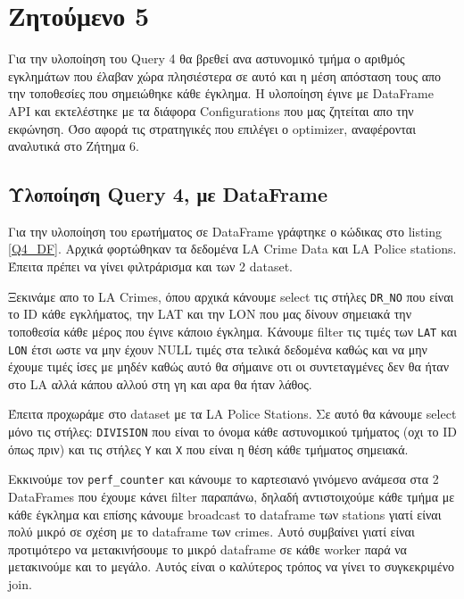 \documentclass[12pt, a4paper]{article}
\begin{document}
\section*{Ζητούμενο 5}

Για την υλοποίηση του Query 4 θα βρεθεί ανα αστυνομικό τμήμα ο αριθμός εγκλημάτων που έλαβαν χώρα
πλησιέστερα σε αυτό και η μέση απόσταση τους απο την τοποθεσίες που σημειώθηκε κάθε έγκλημα. Η υλοποίηση 
έγινε με DataFrame API και εκτελέστηκε με τα διάφορα Configurations που μας ζητείται απο την
εκφώνηση. Όσο αφορά τις στρατηγικές που επιλέγει ο optimizer, αναφέρονται αναλυτικά στο Ζήτημα 6.


\subsection*{Υλοποίηση Query 4, με DataFrame}


Για την υλοποίηση του ερωτήματος σε DataFrame γράφτηκε ο κώδικας στο listing \ref{Q4_DF}.
Αρχικά φορτώθηκαν τα δεδομένα LA Crime Data και LA Police stations. Έπειτα πρέπει να γίνει 
φιλτράρισμα και των 2 dataset. 

Ξεκινάμε απο το LA Crimes, όπου αρχικά κάνουμε select τις στήλες
\texttt{DR\_NO} που είναι το ID κάθε εγκλήματος, την LAT και την LON που μας δίνουν
σημειακά την τοποθεσία κάθε μέρος που έγινε κάποιο έγκλημα. Κάνουμε filter τις τιμές των
\texttt{LAT} και \texttt{LON} έτσι ωστε να μην έχουν NULL τιμές στα τελικά δεδομένα καθώς και να μην έχουμε
τιμές ίσες με μηδέν καθώς αυτό θα σήμαινε οτι οι συντεταγμένες δεν θα ήταν στο LA αλλά 
κάπου αλλού στη γη και αρα θα ήταν λάθος.

Έπειτα προχωράμε στο dataset με τα LA Police Stations. Σε αυτό θα κάνουμε select μόνο τις στήλες:
\texttt{DIVISION} που είναι το όνομα κάθε αστυνομικού τμήματος (οχι το ID όπως πριν) και τις στήλες 
\texttt{Y} και \texttt{X} που είναι η θέση κάθε τμήματος σημειακά.

Εκκινούμε τον \texttt{perf\_counter} και κάνουμε το καρτεσιανό γινόμενο ανάμεσα στα 2 
DataFrames που έχουμε κάνει filter παραπάνω, δηλαδή αντιστοιχούμε κάθε τμήμα με κάθε 
έγκλημα και επίσης κάνουμε broadcast το dataframe των stations γιατί είναι πολύ μικρό σε 
σχέση με το dataframe των crimes. Αυτό συμβαίνει γιατί είναι προτιμότερο να μετακινήσουμε 
το μικρό dataframe σε κάθε worker παρά να μετακινούμε και το μεγάλο. Αυτός είναι ο καλύτερος
τρόπος να γίνει το συγκεκριμένο join.
\end{document}

